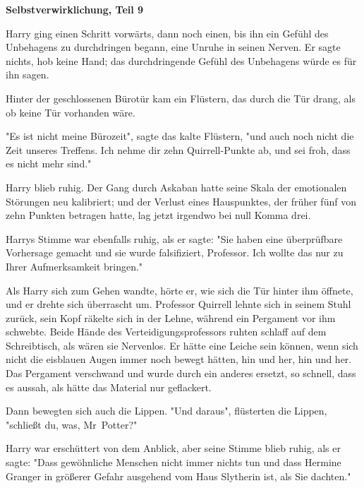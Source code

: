 

\hypertarget{selbstverwirklichung-teil-9}{%

\textbf{Selbstverwirklichung, Teil 9}

Harry ging einen Schritt vorwärts, dann noch einen, bis ihn ein Gefühl des Unbehagens zu durchdringen begann, eine Unruhe in seinen Nerven. Er sagte nichts, hob keine Hand; das durchdringende Gefühl des Unbehagens würde es für ihn sagen.

Hinter der geschlossenen Bürotür kam ein Flüstern, das durch die Tür drang, als ob keine Tür vorhanden wäre.

"Es ist nicht meine Bürozeit", sagte das kalte Flüstern, "und auch noch nicht die Zeit unseres Treffens. Ich nehme dir zehn Quirrell-Punkte ab, und sei froh, dass es nicht mehr sind."

Harry blieb ruhig. Der Gang durch Askaban hatte seine Skala der emotionalen Störungen neu kalibriert; und der Verlust eines Hauspunktes, der früher fünf von zehn Punkten betragen hatte, lag jetzt irgendwo bei null Komma drei.

Harrys Stimme war ebenfalls ruhig, als er sagte: "Sie haben eine überprüfbare Vorhersage gemacht und sie wurde falsifiziert, Professor. Ich wollte das nur zu Ihrer Aufmerksamkeit bringen."

Als Harry sich zum Gehen wandte, hörte er, wie sich die Tür hinter ihm öffnete, und er drehte sich überrascht um. Professor Quirrell lehnte sich in seinem Stuhl zurück, sein Kopf räkelte sich in der Lehne, während ein Pergament vor ihm schwebte. Beide Hände des Verteidigungsprofessors ruhten schlaff auf dem Schreibtisch, als wären sie Nervenlos. Er hätte eine Leiche sein können, wenn sich nicht die eisblauen Augen immer noch bewegt hätten, hin und her, hin und her. Das Pergament verschwand und wurde durch ein anderes ersetzt, so schnell, dass es aussah, als hätte das Material nur geflackert.

Dann bewegten sich auch die Lippen. "Und daraus", flüsterten die Lippen, "schließt du, was, Mr~Potter?"

Harry war erschüttert von dem Anblick, aber seine Stimme blieb ruhig, als er sagte: "Dass gewöhnliche Menschen nicht immer nichts tun und dass Hermine Granger in größerer Gefahr ausgehend vom Haus Slytherin ist, als Sie dachten."

}
